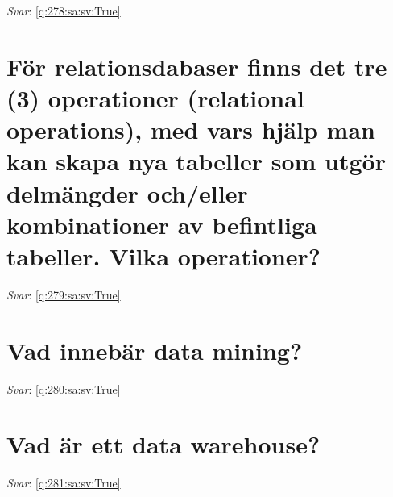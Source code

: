 \documentclass[a4paper,11pt,oneside]{book}
\begin{document}
\begin{sloppypar}
\vspace{2cm}

\noindent\makebox[\textwidth]{\hrulefill}

\vspace{1cm}

\textit{Svar}: \autoref{q:278:sa:sv:True}



\section{F\"or relationsdabaser finns det tre (3) operationer (relational operations), med vars hj\"alp man kan skapa nya tabeller som utg\"or delm\"angder och/eller kombinationer av befintliga tabeller. Vilka operationer?}

\label{q:279:sa:sv:False}

\vspace{2cm}

\noindent\makebox[\textwidth]{\hrulefill}

\vspace{1cm}

\textit{Svar}: \autoref{q:279:sa:sv:True}



\section{Vad inneb\"ar data mining?}

\label{q:280:sa:sv:False}

\vspace{2cm}

\noindent\makebox[\textwidth]{\hrulefill}

\vspace{1cm}

\textit{Svar}: \autoref{q:280:sa:sv:True}



\section{Vad \"ar ett data warehouse?}

\label{q:281:sa:sv:False}

\vspace{2cm}

\noindent\makebox[\textwidth]{\hrulefill}

\vspace{1cm}

\textit{Svar}: \autoref{q:281:sa:sv:True}




\end{sloppypar}
\end{document}
